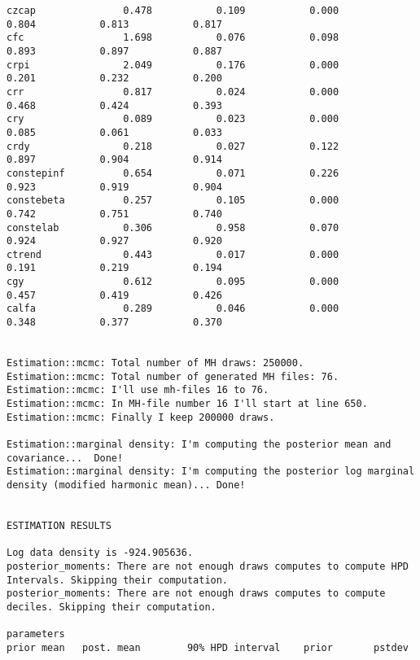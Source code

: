 \documentclass[]{article}
\begin{document}
\begin{verbatim}
czcap      	        0.478 	        0.109 	        0.000	        0.804	        0.813	        0.817
cfc        	        1.698 	        0.076 	        0.098	        0.893	        0.897	        0.887
crpi       	        2.049 	        0.176 	        0.000	        0.201	        0.232	        0.200
crr        	        0.817 	        0.024 	        0.000	        0.468	        0.424	        0.393
cry        	        0.089 	        0.023 	        0.000	        0.085	        0.061	        0.033
crdy       	        0.218 	        0.027 	        0.122	        0.897	        0.904	        0.914
constepinf 	        0.654 	        0.071 	        0.226	        0.923	        0.919	        0.904
constebeta 	        0.257 	        0.105 	        0.000	        0.742	        0.751	        0.740
constelab  	        0.306 	        0.958 	        0.070	        0.924	        0.927	        0.920
ctrend     	        0.443 	        0.017 	        0.000	        0.191	        0.219	        0.194
cgy        	        0.612 	        0.095 	        0.000	        0.457	        0.419	        0.426
calfa      	        0.289 	        0.046 	        0.000	        0.348	        0.377	        0.370


Estimation::mcmc: Total number of MH draws: 250000.
Estimation::mcmc: Total number of generated MH files: 76.
Estimation::mcmc: I'll use mh-files 16 to 76.
Estimation::mcmc: In MH-file number 16 I'll start at line 650.
Estimation::mcmc: Finally I keep 200000 draws.

Estimation::marginal density: I'm computing the posterior mean and covariance...  Done!
Estimation::marginal density: I'm computing the posterior log marginal density (modified harmonic mean)... Done!


ESTIMATION RESULTS

Log data density is -924.905636.
posterior_moments: There are not enough draws computes to compute HPD Intervals. Skipping their computation.
posterior_moments: There are not enough draws computes to compute deciles. Skipping their computation.

parameters
prior mean   post. mean        90% HPD interval    prior       pstdev


\end{verbatim}
\end{document}

